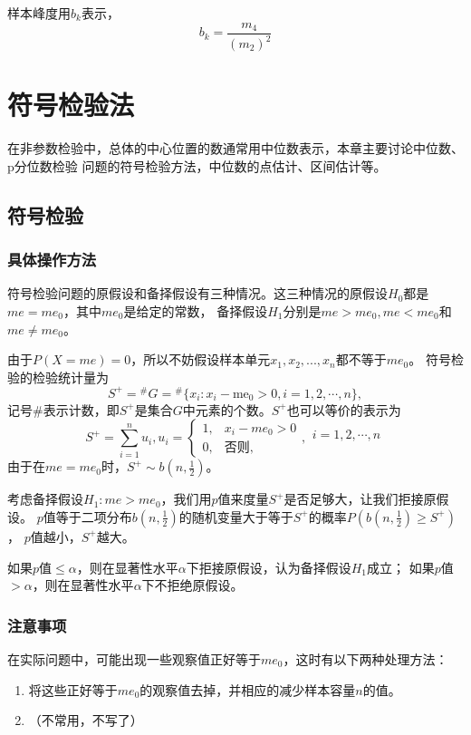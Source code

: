 \documentclass[lang=cn,10pt]{elegantbook}
\begin{document}
样本峰度用$b_k$表示，
\begin{equation}
    b_k=\frac{m_4}{(m_2)^2}
\end{equation}

\chapter{符号检验法}
在非参数检验中，总体的中心位置的数通常用中位数表示，本章主要讨论中位数、p分位数检验
问题的符号检验方法，中位数的点估计、区间估计等。
\section{符号检验}
\subsection{具体操作方法}
符号检验问题的原假设和备择假设有三种情况。这三种情况的原假设$H_0$都是$me = me_0$，其中$me_0$是给定的常数，
备择假设$H_1$分别是$me>me_0,me<me_0$和$me \ne me_0$。

由于$P(X=me)=0$，所以不妨假设样本单元$x_1,x_2,...,x_n$都不等于$me_0$。
符号检验的检验统计量为
\begin{equation}
    S^+ ={}^{\#}G= {}^{\#}\{x_i:x_i-\text{me}_0>0,i=1,2,\cdots,n\},
\end{equation}
记号\#表示计数，即$S^+$是集合$G$中元素的个数。$S^+$也可以等价的表示为
\begin{equation}
    S^+=\sum_{i=1}^nu_i,u_i=
    \begin{cases}
        1, & x_i-me_0>0 \\
        0, & \text{否则,}
    \end{cases},{\begin{array}{c}
                i=1,2,\cdots,n \\
            \end{array}}
\end{equation}
由于在$me = me_0$时，$S^+\sim b(n,\frac12)$。

考虑备择假设$H_1:me>me_0$，我们用$p$值来度量$S^+$是否足够大，让我们拒接原假设。
$p$值等于二项分布$b(n,\frac12)$的随机变量大于等于$S^+$的概率$P(b(n,\frac12)\geq S^+)$，
$p$值越小，$S^+$越大。

如果$p$值$\leq \alpha$，则在显著性水平$\alpha$下拒接原假设，认为备择假设$H_1$成立；
如果$p$值$> \alpha$，则在显著性水平$\alpha$下不拒绝原假设。

\subsection{注意事项}
在实际问题中，可能出现一些观察值正好等于$me_0$，这时有以下两种处理方法：
\begin{enumerate}[1、]
    \item 将这些正好等于$me_0$的观察值去掉，并相应的减少样本容量$n$的值。
    \item （不常用，不写了）
\end{enumerate}
\end{document}
